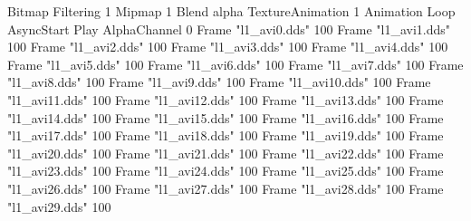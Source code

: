 {Bitmap
  {Filtering 1}
  {Mipmap 1}
  {Blend alpha}
  {TextureAnimation 1}
  {Animation Loop AsyncStart Play}
  {AlphaChannel 0}
  {Frame "l1_avi0.dds" 100}
  {Frame "l1_avi1.dds" 100}
  {Frame "l1_avi2.dds" 100}
  {Frame "l1_avi3.dds" 100}
  {Frame "l1_avi4.dds" 100}
  {Frame "l1_avi5.dds" 100}
  {Frame "l1_avi6.dds" 100}
  {Frame "l1_avi7.dds" 100}
  {Frame "l1_avi8.dds" 100}
  {Frame "l1_avi9.dds" 100}
  {Frame "l1_avi10.dds" 100}
  {Frame "l1_avi11.dds" 100}
  {Frame "l1_avi12.dds" 100}
  {Frame "l1_avi13.dds" 100}
  {Frame "l1_avi14.dds" 100}
  {Frame "l1_avi15.dds" 100}
  {Frame "l1_avi16.dds" 100}
  {Frame "l1_avi17.dds" 100}
  {Frame "l1_avi18.dds" 100}
  {Frame "l1_avi19.dds" 100}
  {Frame "l1_avi20.dds" 100}
  {Frame "l1_avi21.dds" 100}
  {Frame "l1_avi22.dds" 100}
  {Frame "l1_avi23.dds" 100}
  {Frame "l1_avi24.dds" 100}
  {Frame "l1_avi25.dds" 100}
  {Frame "l1_avi26.dds" 100}
  {Frame "l1_avi27.dds" 100}
  {Frame "l1_avi28.dds" 100}
  {Frame "l1_avi29.dds" 100}
}
